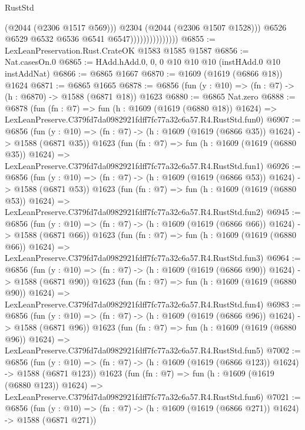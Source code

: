 \begin{lexlean}{RustStd}
\begin{coremodule}
                                      (@2044 (@2306 @1517 @569)))
                                    @2304
                                    (@2044 (@2306 @1507 @1528)))
                                  @6526
                                  @6529
                                  @6532
                                  @6536
                                  @6541
                                  @6547)))))))))))))))
@6855 := LexLeanPreservation.Rust.CrateOK @1583 @1585 @1587
@6856 := Nat.casesOn.{0}
@6865 := HAdd.hAdd.{0, 0, 0} @10 @10 @10 (instHAdd.{0} @10 instAddNat)
@6866 := @6865 @1667
@6870 := @1609 (@1619 (@6866 @18)) @1624
@6871 := @6865 @1665
@6878 := @6856 (fun (y : @10) => (fn : @7) -> (h : @6870) -> @1588 (@6871 @18)) @1623
@6880 := @6865 Nat.zero
@6888 := @6878
    (fun (fn : @7) =>
    fun (h : @1609 (@1619 (@6880 @18)) @1624) =>
    LexLeanPreserve.C379fd7da0982921fdff7fc77a32c6a57.R4.RustStd.fun0)
@6907 := @6856
    (fun (y : @10) => (fn : @7) -> (h : @1609 (@1619 (@6866 @35)) @1624) -> @1588 (@6871 @35))
    @1623
    (fun (fn : @7) =>
    fun (h : @1609 (@1619 (@6880 @35)) @1624) =>
    LexLeanPreserve.C379fd7da0982921fdff7fc77a32c6a57.R4.RustStd.fun1)
@6926 := @6856
    (fun (y : @10) => (fn : @7) -> (h : @1609 (@1619 (@6866 @53)) @1624) -> @1588 (@6871 @53))
    @1623
    (fun (fn : @7) =>
    fun (h : @1609 (@1619 (@6880 @53)) @1624) =>
    LexLeanPreserve.C379fd7da0982921fdff7fc77a32c6a57.R4.RustStd.fun2)
@6945 := @6856
    (fun (y : @10) => (fn : @7) -> (h : @1609 (@1619 (@6866 @66)) @1624) -> @1588 (@6871 @66))
    @1623
    (fun (fn : @7) =>
    fun (h : @1609 (@1619 (@6880 @66)) @1624) =>
    LexLeanPreserve.C379fd7da0982921fdff7fc77a32c6a57.R4.RustStd.fun3)
@6964 := @6856
    (fun (y : @10) => (fn : @7) -> (h : @1609 (@1619 (@6866 @90)) @1624) -> @1588 (@6871 @90))
    @1623
    (fun (fn : @7) =>
    fun (h : @1609 (@1619 (@6880 @90)) @1624) =>
    LexLeanPreserve.C379fd7da0982921fdff7fc77a32c6a57.R4.RustStd.fun4)
@6983 := @6856
    (fun (y : @10) => (fn : @7) -> (h : @1609 (@1619 (@6866 @96)) @1624) -> @1588 (@6871 @96))
    @1623
    (fun (fn : @7) =>
    fun (h : @1609 (@1619 (@6880 @96)) @1624) =>
    LexLeanPreserve.C379fd7da0982921fdff7fc77a32c6a57.R4.RustStd.fun5)
@7002 := @6856
    (fun (y : @10) => (fn : @7) -> (h : @1609 (@1619 (@6866 @123)) @1624) -> @1588 (@6871 @123))
    @1623
    (fun (fn : @7) =>
    fun (h : @1609 (@1619 (@6880 @123)) @1624) =>
    LexLeanPreserve.C379fd7da0982921fdff7fc77a32c6a57.R4.RustStd.fun6)
@7021 := @6856
    (fun (y : @10) => (fn : @7) -> (h : @1609 (@1619 (@6866 @271)) @1624) -> @1588 (@6871 @271))

\end{coremodule}
\end{lexlean}
